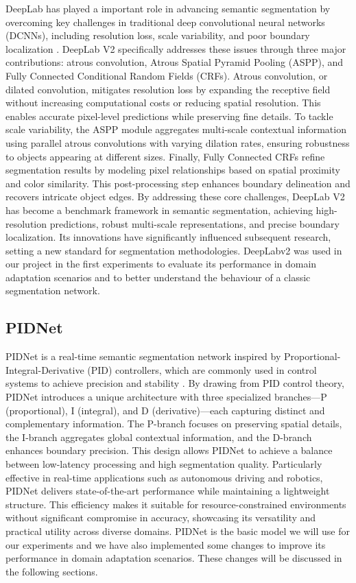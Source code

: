 \documentclass[10pt,twocolumn,letterpaper]{article}
\begin{document}
DeepLab has played a important role in advancing semantic segmentation by overcoming key challenges in traditional deep convolutional neural networks (DCNNs), including resolution loss, scale variability, and poor boundary localization \cite{chen2017deeplab}. DeepLab V2 specifically addresses these issues through three major contributions: atrous convolution, Atrous Spatial Pyramid Pooling (ASPP), and Fully Connected Conditional Random Fields (CRFs).
Atrous convolution, or dilated convolution, mitigates resolution loss by expanding the receptive field without increasing computational costs or reducing spatial resolution. This enables accurate pixel-level predictions while preserving fine details. To tackle scale variability, the ASPP module aggregates multi-scale contextual information using parallel atrous convolutions with varying dilation rates, ensuring robustness to objects appearing at different sizes. Finally, Fully Connected CRFs refine segmentation results by modeling pixel relationships based on spatial proximity and color similarity. This post-processing step enhances boundary delineation and recovers intricate object edges.
By addressing these core challenges, DeepLab V2 has become a benchmark framework in semantic segmentation, achieving high-resolution predictions, robust multi-scale representations, and precise boundary localization. Its innovations have significantly influenced subsequent research, setting a new standard for segmentation methodologies.
DeepLabv2 was used in our project in the first experiments to evaluate its performance in domain adaptation scenarios and to better understand the behaviour of a classic segmentation network.

\subsection{PIDNet}

PIDNet is a real-time semantic segmentation network inspired by Proportional-Integral-Derivative (PID) controllers, which are commonly used in control systems to achieve precision and stability \cite{feng2021pidnet}. By drawing from PID control theory, PIDNet introduces a unique architecture with three specialized branches—P (proportional), I (integral), and D (derivative)—each capturing distinct and complementary information. The P-branch focuses on preserving spatial details, the I-branch aggregates global contextual information, and the D-branch enhances boundary precision. This design allows PIDNet to achieve a balance between low-latency processing and high segmentation quality. Particularly effective in real-time applications such as autonomous driving and robotics, PIDNet delivers state-of-the-art performance while maintaining a lightweight structure. This efficiency makes it suitable for resource-constrained environments without significant compromise in accuracy, showcasing its versatility and practical utility across diverse domains. PIDNet is the basic model we will use for our experiments and we have also implemented some changes to improve its performance in domain adaptation scenarios. These changes will be discussed in the following sections.
\end{document}
